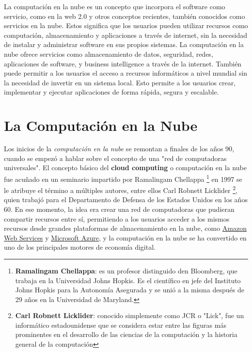 \documentclass[12pt]{article}
\begin{document}
  La computación en la nube es un concepto que incorpora
  el software como servicio, como en la web 2.0 y otros
  conceptos recientes, también conocidos como servicios
  en la nube. Estos significa que los usuarios pueden
  utilizar recursos como computación, almacenamiento y 
  aplicaciones a través de internet, sin la necesidad 
  de instalar y administrar software en sus propios 
  sistemas. La computación en la nube ofrece servicios
  como almacenamiento de datos, seguridad, redes,
  aplicaciones de software, y business intelligence a
  través de la internet. También puede permitir a los 
  usuarios el acceso a recursos informáticos a nivel
  mundial sin la necesidad de invertir en un sistema
  local. Esto permite a los usuarios crear, implementar
  y ejecutar aplicaciones de forma rápida, segura y 
  escalable.

\vspace{1cm}
\section{ La Computación en la Nube}
  Los inicios de la \textit{computación en la nube} se 
  remontan a finales de los años 90, cuando se empezó a
  hablar sobre el concepto de una "red de computadoras
  universales". El concepto básico del \textbf{cloud computing}
  o computación en la nube fue acuñado en un seminario
  impartido por Ramalingam Chellappa \footnote{\textbf{Ramalingam Chellappa}: es un profesor distinguido den Bloomberg, que trabaja en la Universidad Johns Hopkis. Es el científico en jefe del Instituto Johns Hopkis para la Autonomía Asegurada y se unió a la misma después de 29 años en la Universidad de Maryland.} 
  en 1997 se le atribuye
  el término a múltiples autores, entre ellos Carl Robnett Licklider \footnote{\textbf{Carl Robnett Licklider}: conocido simplemente como JCR o "Lick", fue un informático estadounidense que se considera estar entre las figuras más prominentes en el desarrollo de las ciencias de la computación y la historia general de la computación}, 
  quien trabajó para el Departamento
  de Defensa de los Estados Unidos en los años 60. En ese
  momento, la idea era crear una red de computadoras que
  pudieran compartir recursos entre sí, permitiendo a los
  usuarios acceder a los mismos recursos desde grandes
  plataformas de almacenamiento en la nube, como 
  \href{https://aws.amazon.com/es/}{Amazon Web Services} y
  \href{https://azure.microsoft.com/en-us/pricing/purchase-options/pay-as-you-go/}{Microsoft Azure},
  y la computación en la nube se ha convertido en uno de los 
  principales motores de economía digital.
\end{document}
